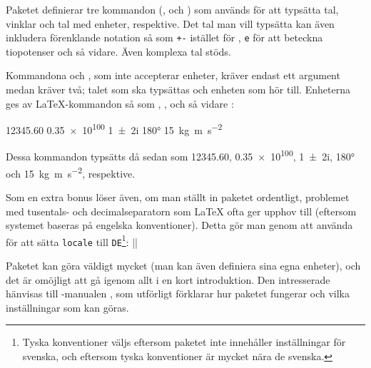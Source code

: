\documentclass[10pt,../../a4.tex]{subfiles}
\begin{document}
Paketet definierar tre kommandon (,  och ) som
används för att typsätta tal, vinklar och tal med enheter, respektive. Det
tal man vill typsätta kan även inkludera förenklande notation så som
\texttt{+-} istället för , \texttt{e} för att beteckna tiopotenser
och så vidare. Även komplexa tal stöds.

Kommandona  och , som inte accepterar enheter, kräver
endast ett argument medan  kräver två; talet som ska typsättas
och enheten som hör till. Enheterna ges av \LaTeX-kommandon så som
, ,  och så vidare
\parencite[en full lista ges av][\ppno~9–12]{Wright11}:
\begin{latexcode}
\num{12345,60} %
\num{.35e100} %
\num{1+-2i}   %
\ang{180}     %
\SI{15}{\kilogram\metre\per\second\squared} %
\end{latexcode}
Dessa kommandon typsätts då sedan som
\num{12345,60}, %
\num{.35e100}, %
\num{1+-2i},   %
\ang{180} och     %
\SI{15}{\kilogram\metre\per\second\squared},
respektive.

Som en extra bonus löser  även, om man ställt in paketet
ordentligt, problemet med tusentals- och decimalseparatorn som \LaTeX{}
ofta ger upphov till (eftersom systemet baseras på engelska konventioner).
Detta gör man genom att använda  för att sätta 
\texttt{locale} till \texttt{DE}\footnote{Tyska konventioner väljs 
eftersom  paketet inte innehåller inställningar för svenska, och eftersom 
tyska konventioner är mycket nära de svenska.}:
\latex||

Paketet kan göra väldigt mycket (man kan även definiera sina egna
enheter), och det är omöjligt att gå igenom allt i en kort introduktion.
Den intresserade hänvisas till -manualen \parencite{Wright11},
som utförligt förklarar hur paketet fungerar och vilka inställningar som
kan göras.
\end{document}
